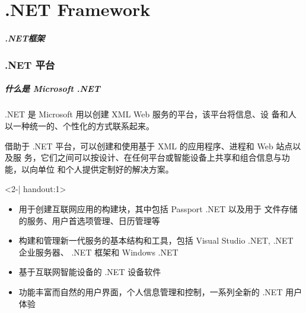 
\part{.NET Framework}

\begin{frame}
\frametitle{.NET框架}
\tableofcontents
\end{frame}

\section{.NET 平台}
\begin{frame}
\frametitle{什么是 Microsoft .NET}

\CJKindent .NET 是 Microsoft 用以创建 XML Web 服务的平台，该平台将信息、设
备和人以一种统一的、个性化的方式联系起来。

\smallskip

借助于 .NET 平台，可以创建和使用基于 XML 的应用程序、进程和 Web 站点以及服
务，它们之间可以按设计、在任何平台或智能设备上共享和组合信息与功能，以向单位
和个人提供定制好的解决方案。



\begin{uncoverenv}<2-| handout:1>

  \begin{itemize}
  \item 用于创建互联网应用的构建块，其中包括 Passport .NET 以及用于
    文件存储的服务、用户首选项管理、日历管理等
  \item 构建和管理新一代服务的基本结构和工具，包括 Visual Studio .NET, .NET
    企业服务器、 .NET 框架和 Windows .NET
  \item 基于互联网智能设备的 .NET 设备软件
  \item 功能丰富而自然的用户界面，个人信息管理和控制，一系列全新的 .NET 用户
    体验
  \end{itemize}
\end{uncoverenv}


\end{frame}

